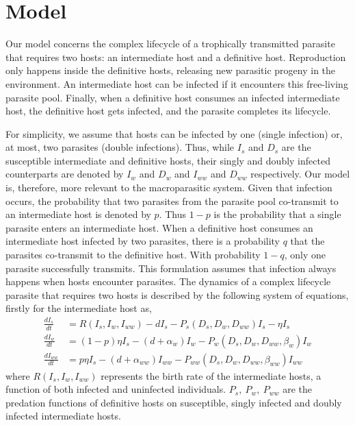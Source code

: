 \documentclass[a4paper]{scrartcl}
\begin{document}
\section*{Model}

Our model concerns the complex lifecycle of a trophically transmitted parasite that requires two hosts: an intermediate host and a definitive host. 
Reproduction only happens inside the definitive hosts, releasing new parasitic progeny in the environment. 
An intermediate host can be infected if it encounters this free-living parasite pool. 
Finally, when a definitive host consumes an infected intermediate host, the definitive host gets infected, and the parasite completes its lifecycle.

For simplicity, we assume that hosts can be infected by one (single infection) or, at most, two parasites (double infections).
Thus, while $I_s$ and $D_s$ are the susceptible intermediate and definitive hosts, their singly and doubly infected counterparts are denoted by $I_w$ and $D_w$ and $I_{ww}$ and $D_{ww}$ respectively.
Our model is, therefore, more relevant to the macroparasitic system.
Given that infection occurs, the probability that two parasites from the parasite pool co-transmit to an intermediate host is denoted by  $p$. 
Thus $1-p$ is the probability that a single parasite enters an intermediate host. 
When a definitive host consumes an intermediate host infected by two parasites, there is a probability $q$ that the parasites co-transmit to the definitive host.
With probability $1-q$, only one parasite successfully transmits. 
This formulation assumes that infection always happens when hosts encounter parasites.
The dynamics of a complex lifecycle parasite that requires two hosts is described by the following system of equations, firstly for the intermediate host as,
%
\begin{align}
\frac{dI_s}{dt} &= R(I_s, I_w, I_{ww}) - d I_s - P_s(D_s, D_w, D_{ww}) I_s  - \eta  I_s \nonumber \\ 
\frac{dI_w}{dt} &=  (1 - p) \eta I_s  - (d + \alpha_w) I_w - P_w(D_s, D_w, D_{ww}, \beta_w) I_w \label{odes:ihosts} \\
\frac{dI_{ww}}{dt} &= p \eta I_s  - (d + \alpha_{ww}) I_{ww} - P_{ww}(D_s, D_w, D_{ww}, \beta_{ww}) I_{ww} \nonumber
\end{align}
%
where $R(I_s, I_w, I_{ww})$ represents the birth rate of the intermediate hosts, a function of both infected and uninfected individuals.
$P_s, \ P_w, \ P_{ww}$ are the predation functions of definitive hosts on susceptible, singly infected and doubly infected intermediate hosts. 
\end{document}

